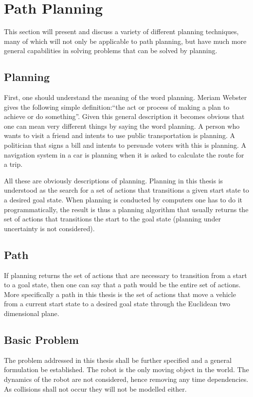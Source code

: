 \chapter{Path Planning}
\label{ch:pathPlanning}
This section will present and discuss a variety of different planning techniques, many of which will not only be applicable to path planning, but have much more general capabilities in solving problems that can be solved by planning.

\section{Planning}
First, one should understand the meaning of the word planning. Meriam Webster gives the following simple definition:``the act or process of making a plan to achieve or do something''. Given this general description it becomes obvious that one can mean very different things by saying the word planning. A person who wants to visit a friend and intents to use public transportation is planning. A politician that signs a bill and intents to persuade voters with this is planning. A navigation system in a car is planning when it is asked to calculate the route for a trip.

All these are obviously descriptions of planning. Planning in this thesis is understood as the search for a set of actions that transitions a given start state to a desired goal state. When planning is conducted by computers one has to do it programmatically, the result is thus a planning algorithm that usually returns the set of actions that transitions the start to the goal state (planning under uncertainty is not considered).

\section{Path}
If planning returns the set of actions that are necessary to transition from a start to a goal state, then one can say that a path would be the entire set of actions. More specifically a path in this thesis is the set of actions that move a vehicle from a current start state to a desired goal state through the Euclidean two dimensional plane.

\section{Basic Problem}
The problem addressed in this thesis shall be further specified and a general formulation be established. The robot is the only moving object in the world. The dynamics of the robot are not considered, hence removing any time dependencies. As collisions shall not occur they will not be modelled either.

